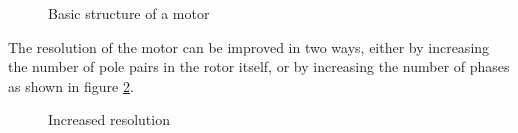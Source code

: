 \begin{figure}[htp]
    \centering
    \hfill%
    \caption{Basic structure of a motor}
    \label{fig:bas_struct} 
\end{figure}

The resolution of the motor can be improved in two ways, either by increasing the number of pole pairs in the rotor itself, or by increasing the number of phases as shown in figure \ref{fig:inc_res}.


\begin{figure}[htp]
    \hfill
    \hfill%
	\hfill%
	\hfill%
	\caption{Increased resolution}
	\label{fig:inc_res}
\end{figure}

